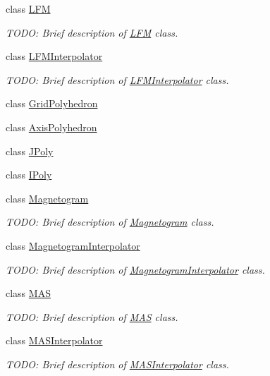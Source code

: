 \begin{DoxyCompactItemize}
class \hyperlink{classccmc_1_1_l_f_m}{L\-F\-M}
\begin{DoxyCompactList}\small\item\em T\-O\-D\-O\-: Brief description of \hyperlink{classccmc_1_1_l_f_m}{L\-F\-M} class. \end{DoxyCompactList}\item 
class \hyperlink{classccmc_1_1_l_f_m_interpolator}{L\-F\-M\-Interpolator}
\begin{DoxyCompactList}\small\item\em T\-O\-D\-O\-: Brief description of \hyperlink{classccmc_1_1_l_f_m_interpolator}{L\-F\-M\-Interpolator} class. \end{DoxyCompactList}\item 
class \hyperlink{classccmc_1_1_grid_polyhedron}{Grid\-Polyhedron}
\item 
class \hyperlink{classccmc_1_1_axis_polyhedron}{Axis\-Polyhedron}
\item 
class \hyperlink{classccmc_1_1_j_poly}{J\-Poly}
\item 
class \hyperlink{classccmc_1_1_i_poly}{I\-Poly}
\item 
class \hyperlink{classccmc_1_1_magnetogram}{Magnetogram}
\begin{DoxyCompactList}\small\item\em T\-O\-D\-O\-: Brief description of \hyperlink{classccmc_1_1_magnetogram}{Magnetogram} class. \end{DoxyCompactList}\item 
class \hyperlink{classccmc_1_1_magnetogram_interpolator}{Magnetogram\-Interpolator}
\begin{DoxyCompactList}\small\item\em T\-O\-D\-O\-: Brief description of \hyperlink{classccmc_1_1_magnetogram_interpolator}{Magnetogram\-Interpolator} class. \end{DoxyCompactList}\item 
class \hyperlink{classccmc_1_1_m_a_s}{M\-A\-S}
\begin{DoxyCompactList}\small\item\em T\-O\-D\-O\-: Brief description of \hyperlink{classccmc_1_1_m_a_s}{M\-A\-S} class. \end{DoxyCompactList}\item 
class \hyperlink{classccmc_1_1_m_a_s_interpolator}{M\-A\-S\-Interpolator}
\begin{DoxyCompactList}\small\item\em T\-O\-D\-O\-: Brief description of \hyperlink{classccmc_1_1_m_a_s_interpolator}{M\-A\-S\-Interpolator} class. \end{DoxyCompactList}\item 

\end{DoxyCompactItemize}
